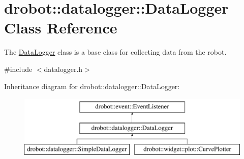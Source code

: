 \hypertarget{classdrobot_1_1datalogger_1_1DataLogger}{\section{drobot\-:\-:datalogger\-:\-:Data\-Logger Class Reference}
\label{classdrobot_1_1datalogger_1_1DataLogger}
}


The \hyperlink{classdrobot_1_1datalogger_1_1DataLogger}{Data\-Logger} class is a base class for collecting data from the robot.  




{\ttfamily \#include $<$datalogger.\-h$>$}

Inheritance diagram for drobot\-:\-:datalogger\-:\-:Data\-Logger\-:\begin{figure}[H]
\begin{center}
\leavevmode
\includegraphics[height=3.000000cm]{classdrobot_1_1datalogger_1_1DataLogger}
\end{center}
\end{figure}
